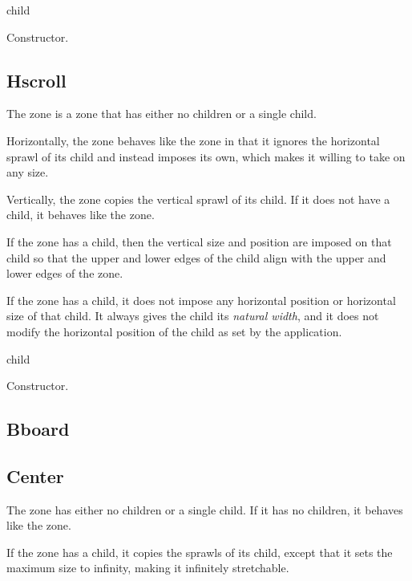 

 {\optional child}

Constructor. 

\subsection{Hscroll}


The  zone is a zone that has either no children or a single
child.  

Horizontally, the  zone behaves like the 
zone in that it ignores the horizontal sprawl of its child and instead
imposes its own, which makes it willing to take on any size.  

Vertically, the  zone copies the vertical sprawl of
its child.  If it does not have a child, it behaves like the
 zone.  

If the  zone has a child, then the vertical size and
position are imposed on that child so that the upper and lower edges of
the child align with the upper and lower edges of the 
zone.  

If the  zone has a child, it does not impose any horizontal
position or horizontal size of that child.  It always gives the child
its \emph{natural width}, and it does not modify the horizontal
position of the child as set by the application.


 {\optional child}

Constructor. 

\subsection{Bboard}



\subsection{Center}

The  zone has either no children or a single child.  If
it has no children, it behaves like the  zone.

If the  zone has a child, it copies the sprawls of its
child, except that it sets the maximum size to infinity, making it
infinitely stretchable.  

